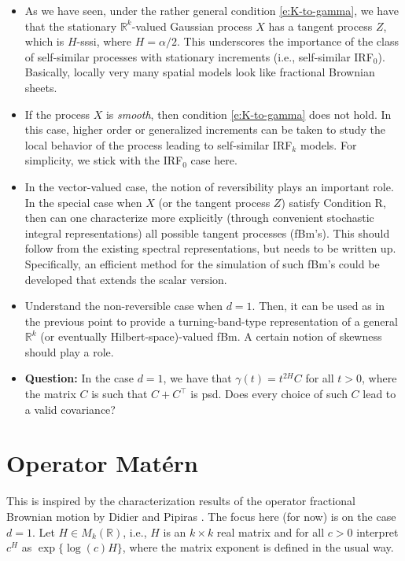 \documentclass[11pt]{article}
\def\R{\mathbb R}
\theoremstyle{plain}
\theoremstyle{definition}
\theoremstyle{condition}
\theoremstyle{remark}
\begin{document}
 \begin{itemize}
  \item As we have seen, under the rather general condition \eqref{e:K-to-gamma}, we have that the stationary $\R^k$-valued Gaussian process $X$
  has a tangent process $Z$, which is $H$-sssi, where $H =\alpha/2$.  This underscores the importance of the class of self-similar processes with
  stationary increments (i.e., self-similar IRF$_0$).  Basically, locally very many spatial models look like fractional Brownian sheets.
  
  \item If the process $X$ is {\em smooth}, then condition \eqref{e:K-to-gamma} does not hold.  In this case, higher order or generalized increments 
  can be taken to study the local behavior of the process leading to self-similar IRF$_k$ models.  For simplicity, we stick with the IRF$_0$ case here.
  
  \item In the vector-valued case, the notion of reversibility plays an important role.  In the special case when $X$ (or the tangent process $Z$) satisfy Condition R,
  then can one characterize more explicitly (through convenient stochastic integral representations) all possible tangent processes (fBm's).  This should follow
  from the existing spectral representations, but needs to be written up.  Specifically, an efficient method for the simulation of such fBm's could be developed that
  extends the scalar version.    
  
  \item Understand the non-reversible case when $d=1$.  Then, it can be used as in the previous point to provide a turning-band-type representation of a
  general $\R^k$ (or eventually Hilbert-space)-valued fBm.  A certain notion of skewness should play a role. 
  
  \item {\bf Question:} In the case $d=1$,  we have that $\gamma(t) = t^{2H} C$ for all $t>0$, where the matrix $C$ is such that $C+C^\top$ is psd.  Does
  every choice of such $C$ lead to a valid covariance? 
  
 \end{itemize}
 
 \section{Operator Mat\'ern}
 
  This is inspired by the characterization results of the operator fractional Brownian motion by Didier and Pipiras  \cite{didier:pipiras:2011}.  The focus here (for now) is on the case $d=1$.
  Let $H \in M_k(\R)$, i.e., $H$ is an $k\times k$ real matrix and for all $c>0$ interpret $c^H$ as $\exp\{ \log(c) H\}$, where the matrix exponent is defined in the usual way.
  
\end{document}
